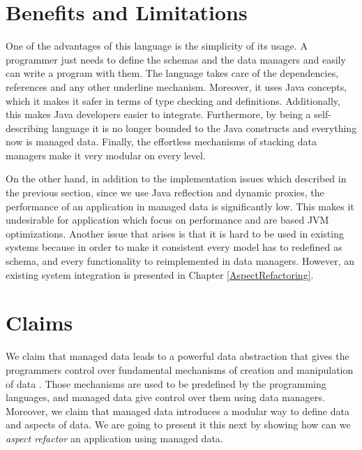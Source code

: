 \section{Benefits and Limitations}\label{Benefits and Limitations}
One of the advantages of this language is the simplicity of its usage. 
A programmer just needs to define the schemas and the data managers and easily can write a program with them.
The language takes care of the dependencies, references and any other underline mechanism.
Moreover, it uses Java concepts, which it makes it safer in terms of type checking and definitions. 
Additionally, this makes Java developers easier to integrate.
Furthermore, by being a self-describing language it is no longer bounded to the Java constructs and everything now is managed data.
Finally, the effortless mechanisms of stacking data managers make it very modular on every level.

On the other hand, in addition to the implementation issues which described in the previous section, since we use Java reflection and dynamic proxies, the performance of an application in managed data is significantly low. 
This makes it undesirable for application which focus on performance and are based JVM optimizations.
Another issue that arises is that it is hard to be used in existing systems because in order to make it consistent every model has to redefined as schema, and every functionality to reimplemented in data managers.
However, an existing system integration is presented in Chapter \ref{AspectRefactoring}.

\section{Claims}\label{Implementation Claims}
We claim that managed data leads to a powerful data abstraction that gives the programmers control over fundamental mechanisms of creation and manipulation of data \cite{loh2012managed}.
Those mechanisms are used to be predefined by the programming languages, and managed data give control over them using data managers.
Moreover, we claim that managed data introduces a modular way to define data and aspects of data. 
We are going to present it this next by showing how can we \textit{aspect refactor} an application using managed data.